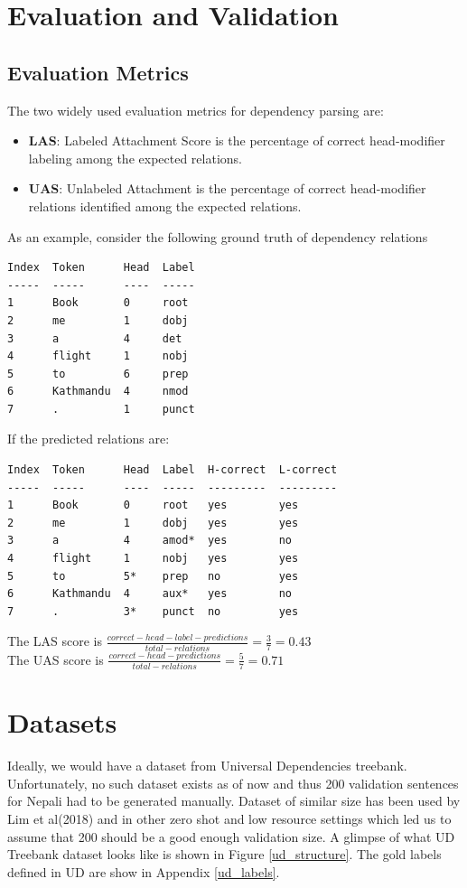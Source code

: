 \section{Evaluation and Validation}
\subsection{Evaluation Metrics}
The two widely used evaluation metrics for dependency parsing are:
\begin{itemize}
    \item \textbf{LAS}: Labeled Attachment Score is the percentage of correct head-modifier labeling among the expected relations.
    \item \textbf{UAS}: Unlabeled Attachment is the percentage of correct head-modifier relations identified among the expected relations.
\end{itemize}
As an example, consider the following ground truth of dependency relations
\begin{verbatim}
Index  Token      Head  Label
-----  -----      ----  -----
1      Book       0     root
2      me         1     dobj
3      a          4     det
4      flight     1     nobj
5      to         6     prep
6      Kathmandu  4     nmod
7      .          1     punct
\end{verbatim}
If the predicted relations are:
\begin{verbatim}
Index  Token      Head  Label  H-correct  L-correct
-----  -----      ----  -----  ---------  ---------
1      Book       0     root   yes        yes
2      me         1     dobj   yes        yes
3      a          4     amod*  yes        no
4      flight     1     nobj   yes        yes
5      to         5*    prep   no         yes
6      Kathmandu  4     aux*   yes        no
7      .          3*    punct  no         yes
\end{verbatim}
The LAS score is $\frac{correct-head-label-predictions}{total-relations} = \frac{3}{7} = 0.43$\\
The UAS score is $\frac{correct-head-predictions}{total-relations} = \frac{5}{7} = 0.71$

\section{Datasets}
Ideally, we would have a dataset from Universal Dependencies treebank.
Unfortunately, no such dataset exists as of now and thus 200 validation
sentences for Nepali had to be generated manually. Dataset of similar size has
been used by Lim et al(2018)\cite{multilingualCaseStudy} and in other zero shot
and low resource settings\cite{udapter}\cite{zero-shot} which led us to assume
that 200 should be a good enough validation size. A glimpse of what UD Treebank
dataset looks like is shown in Figure \ref{ud_structure}. The gold labels
defined in UD are show in Appendix \ref{ud_labels}.

